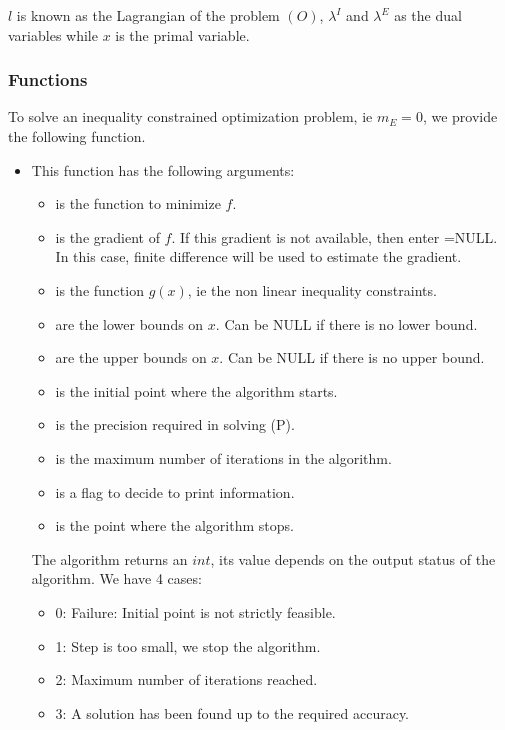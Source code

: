 $l$ is known as the Lagrangian of the problem $(O)$, $\lambda^I$ and $\lambda^E$ as the dual variables while $x$ is the primal variable.

\subsubsection{Functions}

To solve an inequality constrained optimization problem, ie $m_E=0$, we provide the following function.
\begin{itemize}
\item {}
  \sshortdescribe This function has the following arguments:

  \begin{itemize}
  \item {} is the function to minimize $f$.
  \item {} is the gradient of $f$. If this gradient is not available, then enter =NULL. In this case, finite difference will be used to estimate the gradient.
  \item {} is the function $g(x)$, ie the non linear inequality constraints.
  \item {} are the lower bounds on $x$. Can be NULL if there is no
    lower bound.
  \item {} are the upper bounds on $x$. Can be NULL if there is no
    upper bound.
  \item {} is the initial point where the algorithm starts.
  \item {} is the precision required in solving (P).
  \item {} is the maximum number of iterations in the algorithm.
  \item {} is a flag to decide to print information.
  \item {} is the point where the algorithm stops.
  \end{itemize}

  The algorithm returns an $int$, its value depends on the output status of the algorithm. We have 4 cases:
  \begin{itemize}
  \item 0: Failure: Initial point is not strictly feasible.
  \item 1: Step is too small, we stop the algorithm.
  \item 2: Maximum number of iterations reached.
  \item 3: A solution has been found up to the required accuracy.
  \end{itemize}


\end{itemize}
